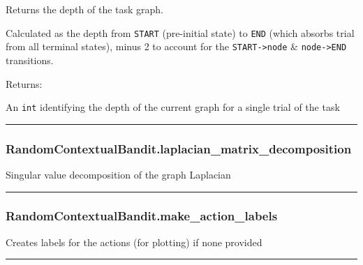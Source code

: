 Returns the depth of the task graph.

Calculated as the depth from \texttt{START} (pre-initial state) to
\texttt{END} (which absorbs trial from all terminal states), minus 2 to
account for the \texttt{START-\textgreater{}node} \&
\texttt{node-\textgreater{}END} transitions.

Returns:

An \texttt{int} identifying the depth of the current graph for a single
trial of the task

\begin{center}\rule{0.5\linewidth}{\linethickness}\end{center}

\subsubsection{RandomContextualBandit.laplacian\_matrix\_decomposition}\label{randomcontextualbandit.laplacian_matrix_decomposition}

\begin{Shaded}
\begin{Highlighting}[]
\NormalTok{)}
\end{Highlighting}
\end{Shaded}

Singular value decomposition of the graph Laplacian

\begin{center}\rule{0.5\linewidth}{\linethickness}\end{center}

\subsubsection{RandomContextualBandit.make\_action\_labels}\label{randomcontextualbandit.make_action_labels}

\begin{Shaded}
\begin{Highlighting}[]
\NormalTok{)}
\end{Highlighting}
\end{Shaded}

Creates labels for the actions (for plotting) if none provided

\begin{center}\rule{0.5\linewidth}{\linethickness}\end{center}

